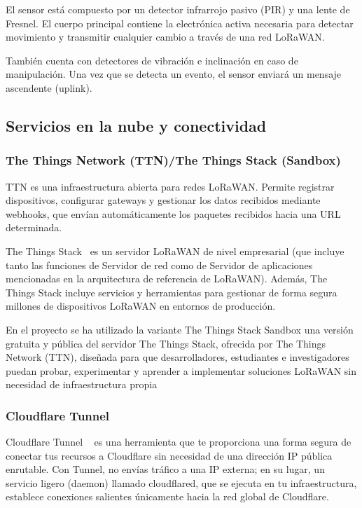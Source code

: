El sensor está compuesto por un detector infrarrojo pasivo (PIR) y una lente de Fresnel. El cuerpo principal contiene la electrónica activa necesaria para detectar movimiento y transmitir cualquier cambio a través de una red LoRaWAN.

También cuenta con detectores de vibración e inclinación en caso de manipulación. Una vez que se detecta un evento, el sensor enviará un mensaje ascendente (uplink).



\subsection{Servicios en la nube y conectividad}
\subsubsection{The Things Network (TTN)/The Things Stack (Sandbox)}
TTN es una infraestructura abierta para redes LoRaWAN. Permite registrar dispositivos, configurar gateways y gestionar los datos recibidos mediante webhooks, que envían automáticamente los paquetes recibidos hacia una URL determinada.


The Things Stack~\cite{TTN:TTS} es un servidor LoRaWAN de nivel empresarial (que incluye tanto las funciones de Servidor de red como de Servidor de aplicaciones mencionadas en la arquitectura de referencia de LoRaWAN). Además, The Things Stack incluye servicios y herramientas para gestionar de forma segura millones de dispositivos LoRaWAN en entornos de producción.

En el proyecto se ha utilizado la variante The Things Stack Sandbox una versión gratuita y pública del servidor The Things Stack, ofrecida por The Things Network (TTN), diseñada para que desarrolladores, estudiantes e investigadores puedan probar, experimentar y aprender a implementar soluciones LoRaWAN sin necesidad de infraestructura propia


\subsubsection{Cloudflare Tunnel}
Cloudflare Tunnel ~\cite{CDF:tun} es una herramienta que te proporciona una forma segura de conectar tus recursos a Cloudflare sin necesidad de una dirección IP pública enrutable. Con Tunnel, no envías tráfico a una IP externa; en su lugar, un servicio ligero (daemon) llamado cloudflared, que se ejecuta en tu infraestructura, establece conexiones salientes únicamente hacia la red global de Cloudflare.

